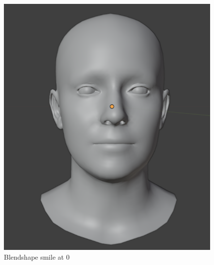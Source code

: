 \documentclass[../../main.tex]{subfiles}
\begin{document}
\begin{subfigure}{0.33\linewidth}
  \includegraphics[width=\linewidth]{chapters/background_work/images/blendshapes_example/blendshapes_example_1.png}
  \caption{Blendshape smile at 0}
\end{subfigure}
\hfill
\end{document}
